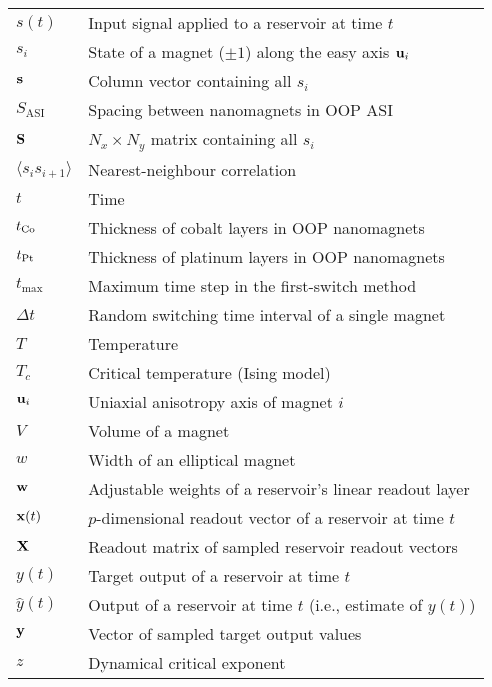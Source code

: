\begin{longtable}[l]{p{60pt} p{350pt}}
	$s(t)$ & Input signal applied to a reservoir at time $t$ \\
	$s_i$ & State of a magnet ($\pm 1$) along the easy axis $\boldsymbol{\mathbf{u}}_i$ \\
	$\boldsymbol{\mathbf{s}}$ & Column vector containing all $s_i$ \\
	$S_\mathrm{ASI}$ & Spacing between nanomagnets in OOP ASI \\
	$\boldsymbol{\mathbf{S}}$ & $N_x \times N_y$ matrix containing all $s_i$ \\
	$\langle s_i s_{i+1} \rangle$ & Nearest-neighbour correlation\vspace{\whiteline}\\

	$t$ & Time \\
	$t_{\ce{Co}}$ & Thickness of cobalt layers in OOP nanomagnets \\
	$t_{\ce{Pt}}$ & Thickness of platinum layers in OOP nanomagnets \\
	$t_\mathrm{max}$ & Maximum time step in the first-switch method \\
	$\Delta t$ & Random switching time interval of a single magnet \\
	$T$ & Temperature \\
	$T_c$ & Critical temperature (Ising model)\vspace{\whiteline}\\

	$\boldsymbol{\mathbf{u}}_i$ & Uniaxial anisotropy axis of magnet $i$\vspace{\whiteline}\\

	$V$ & Volume of a magnet\vspace{\whiteline}\\

	$w$ & Width of an elliptical magnet \\
	$\boldsymbol{\mathbf{w}}$ & Adjustable weights of a reservoir's linear readout layer\vspace{\whiteline}\\
	
	$\boldsymbol{\mathbf{x}}(t)$ & $p$-dimensional readout vector of a reservoir at time $t$ \\
	$\boldsymbol{\mathbf{X}}$ & Readout matrix of sampled reservoir readout vectors\vspace{\whiteline}\\
	
	$y(t)$ & Target output of a reservoir at time $t$ \\
	$\hat{y}(t)$ & Output of a reservoir at time $t$ (i.e., estimate of $y(t)$) \\
	$\boldsymbol{\mathbf{y}}$ & Vector of sampled target output values\vspace{\whiteline}\\
	
	$z$ & Dynamical critical exponent\vspace{\whiteline}\\
\end{longtable}

